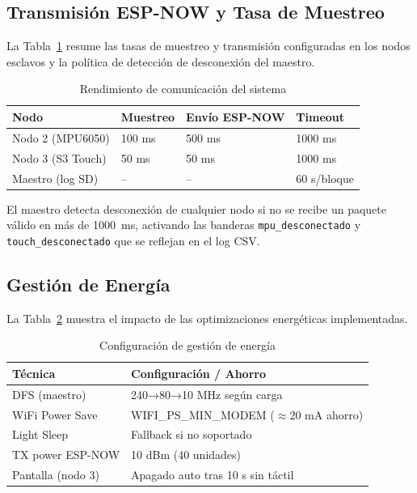 \documentclass[10pt,twocolumn,a4paper]{article}
\begin{document}
\subsection{Transmisión ESP-NOW y Tasa de Muestreo}

La Tabla~\ref{tab:perf} resume las tasas de muestreo y transmisión
configuradas en los nodos esclavos y la política de detección de
desconexión del maestro.

\begin{table}[H]
\centering
\caption{Rendimiento de comunicación del sistema}
\label{tab:perf}
\scriptsize
\begin{tabular}{p{1.9cm}p{1.3cm}p{1.5cm}p{1.1cm}}
\toprule
\textbf{Nodo} & \textbf{Muestreo} & \textbf{Envío ESP-NOW} & \textbf{Timeout} \\
\midrule
Nodo 2 (MPU6050) & 100 ms & 500 ms & 1000 ms \\
Nodo 3 (S3 Touch) & 50 ms & 50 ms & 1000 ms \\
Maestro (log SD) & -- & -- & 60 s/bloque \\
\bottomrule
\end{tabular}
\end{table}

El maestro detecta desconexión de cualquier nodo si no se recibe un
paquete válido en más de 1000~ms, activando las banderas
\texttt{mpu\_desconectado} y \texttt{touch\_desconectado} que se
reflejan en el log CSV.

\subsection{Gestión de Energía}

La Tabla~\ref{tab:power} muestra el impacto de las optimizaciones
energéticas implementadas.

\begin{table}[H]
\centering
\caption{Configuración de gestión de energía}
\label{tab:power}
\scriptsize
\begin{tabular}{p{3.0cm}p{3.7cm}}
\toprule
\textbf{Técnica} & \textbf{Configuración / Ahorro} \\
\midrule
DFS (maestro) & 240→80→10 MHz según carga \\
WiFi Power Save & WIFI\_PS\_MIN\_MODEM ($\approx$20 mA ahorro) \\
Light Sleep & Fallback si no soportado \\
TX power ESP-NOW & 10 dBm (40 unidades) \\
Pantalla (nodo 3) & Apagado auto tras 10 s sin táctil \\
\bottomrule
\end{tabular}
\end{table}
\end{document}
